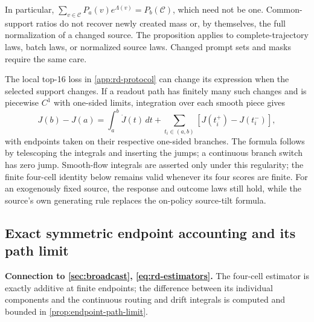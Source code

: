 In particular, $\sum_{v\in\mathcal C}P_a(v)e^{\Lambda(v)}=P_b(\mathcal C)$, which need not be one. Common-support ratios do not recover newly created mass or, by themselves, the full normalization of a changed source. The proposition applies to complete-trajectory laws, batch laws, or normalized source laws. Changed prompt sets and masks require the same care.

The local top-16 loss in \cref{app:rd-protocol} can change its expression when the selected support changes. If a readout path has finitely many such changes and is piecewise $C^1$ with one-sided limits, integration over each smooth piece gives
\[
 J(b)-J(a)=\int_a^b\dot J(t)\,dt+
       \sum_{t_i\in(a,b)}[J(t_i^+)-J(t_i^-)],
\]
with endpoints taken on their respective one-sided branches. The formula follows by telescoping the integrals and inserting the jumps; a continuous branch switch has zero jump. Smooth-flow integrals are asserted only under this regularity; the finite four-cell identity below remains valid whenever its four scores are finite. For an exogenously fixed source, the response and outcome laws still hold, while the source's own generating rule replaces the on-policy source-tilt formula.

\subsection{Exact symmetric endpoint accounting and its path limit}
\label{app:rd-theory}
\textbf{Connection to \cref{sec:broadcast}, \cref{eq:rd-estimators}.} The four-cell estimator is exactly additive at finite endpoints; the difference between its individual components and the continuous routing and drift integrals is computed and bounded in \cref{prop:endpoint-path-limit}.

